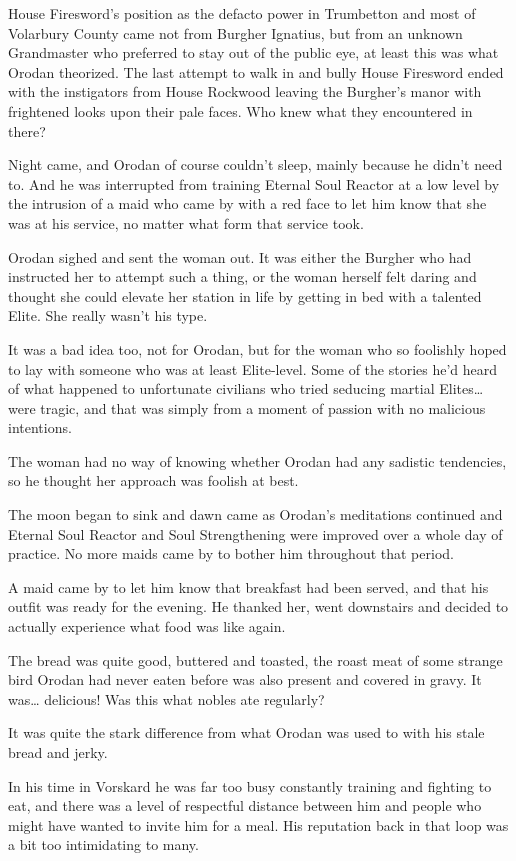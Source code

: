 \documentclass[a4paper,10pt]{book}
\begin{document}
House Firesword’s position as the defacto power in Trumbetton and most of Volarbury County came not from Burgher Ignatius, but from an unknown Grandmaster who preferred to stay out of the public eye, at least this was what Orodan theorized. The last attempt to walk in and bully House Firesword ended with the instigators from House Rockwood leaving the Burgher’s manor with frightened looks upon their pale faces. Who knew what they encountered in there?\par
Night came, and Orodan of course couldn’t sleep, mainly because he didn’t need to. And he was interrupted from training Eternal Soul Reactor at a low level by the intrusion of a maid who came by with a red face to let him know that she was at his service, no matter what form that service took.\par
Orodan sighed and sent the woman out. It was either the Burgher who had instructed her to attempt such a thing, or the woman herself felt daring and thought she could elevate her station in life by getting in bed with a talented Elite. She really wasn’t his type.\par
It was a bad idea too, not for Orodan, but for the woman who so foolishly hoped to lay with someone who was at least Elite-level. Some of the stories he’d heard of what happened to unfortunate civilians who tried seducing martial Elites… were tragic, and that was simply from a moment of passion with no malicious intentions.\par
The woman had no way of knowing whether Orodan had any sadistic tendencies, so he thought her approach was foolish at best.\par
The moon began to sink and dawn came as Orodan’s meditations continued and Eternal Soul Reactor and Soul Strengthening were improved over a whole day of practice. No more maids came by to bother him throughout that period.\par
A maid came by to let him know that breakfast had been served, and that his outfit was ready for the evening. He thanked her, went downstairs and decided to actually experience what food was like again.\par
The bread was quite good, buttered and toasted, the roast meat of some strange bird Orodan had never eaten before was also present and covered in gravy. It was… delicious! Was this what nobles ate regularly?\par
It was quite the stark difference from what Orodan was used to with his stale bread and jerky.\par
In his time in Vorskard he was far too busy constantly training and fighting to eat, and there was a level of respectful distance between him and people who might have wanted to invite him for a meal. His reputation back in that loop was a bit too intimidating to many.\par
\end{document}
